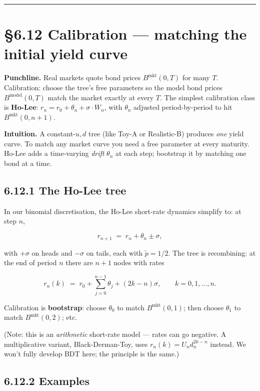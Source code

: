 \documentclass[
  10pt,
  twoside]{book}
\begin{document}
\begin{center}\rule{0.5\linewidth}{0.5pt}\end{center}

\section{§6.12 Calibration --- matching the initial yield
curve}\label{calibration-matching-the-initial-yield-curve}

\textbf{Punchline.} Real markets quote bond prices
\(B^{\text{mkt}}(0, T)\) for many \(T\). Calibration: choose the tree's
free parameters so the model bond prices \(B^{\text{model}}(0, T)\)
match the market exactly at every \(T\). The simplest calibration class
is \textbf{Ho-Lee}: \(r_n = r_0 + \theta_n + \sigma \cdot W_n\), with
\(\theta_n\) adjusted period-by-period to hit
\(B^{\text{mkt}}(0, n+1)\).

\textbf{Intuition.} A constant-\(u, d\) tree (like Toy-A or Realistic-B)
produces \emph{one} yield curve. To match any market curve you need a
free parameter at every maturity. Ho-Lee adds a time-varying
\emph{drift} \(\theta_n\) at each step; bootstrap it by matching one
bond at a time.

\subsection{6.12.1 The Ho-Lee tree}\label{the-ho-lee-tree}

In our binomial discretisation, the Ho-Lee short-rate dynamics simplify
to: at step \(n\),

\[r_{n+1} \;=\; r_n + \theta_n \pm \sigma,\]

with \(+\sigma\) on heads and \(-\sigma\) on tails, each with
\(\tilde p = 1/2\). The tree is recombining: at the end of period \(n\)
there are \(n + 1\) nodes with rates

\[r_n(k) \;=\; r_0 + \sum_{j=0}^{n-1}\theta_j + (2k - n)\sigma, \qquad k = 0, 1, \ldots, n.\]

Calibration is \textbf{bootstrap}: choose \(\theta_0\) to match
\(B^{\text{mkt}}(0, 1)\); then choose \(\theta_1\) to match
\(B^{\text{mkt}}(0, 2)\); etc.

(Note: this is an \emph{arithmetic} short-rate model --- rates can go
negative. A multiplicative variant, Black-Derman-Toy, uses
\(r_n(k) = U_n d_n^{2k - n}\) instead. We won't fully develop BDT here;
the principle is the same.)

\subsection{6.12.2 Examples}\label{examples-34}
\end{document}
